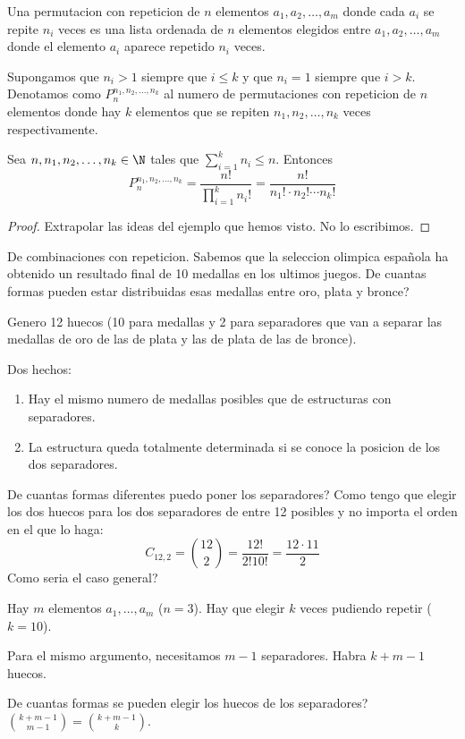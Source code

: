 \begin{definition}
	Una permutacion con repeticion de \(n \) elementos \(a_1,a_2, \ldots, a_m \) donde cada \(a_i \) se repite \(n_i \) veces es una lista ordenada de \(n \) elementos elegidos entre \(a_1,a_2,\ldots,a_m \) donde el elemento \(a_i \) aparece repetido \(n_i \) veces.

	Supongamos que \(n_i > 1 \) siempre que \(i \leq k \) y que \(n_i = 1 \) siempre que \(i > k \). Denotamos como \(P^{n_1,n_2,\ldots,n_k}_n \) al numero de permutaciones con repeticion de \(n \) elementos donde hay \(k \) elementos que se repiten \(n_1,n_2, \ldots, n_k \) veces respectivamente.
\end{definition}
\begin{theorem}
	Sea \(n,n_1,n_2,\ldots,n_k \in \N \) tales que \(\sum_{i=1}^{k} n_i \leq n \). Entonces
	\[
		P^{n_1,n_2,\ldots,n_k}_{n} = \frac{n! }{\prod_{i =1}^{k} n_i !} = \frac{n! }{n_1! \cdot n_2! \cdots n_k!}
	\]
\end{theorem}
\begin{proof}
	Extrapolar las ideas del ejemplo que hemos visto. No lo escribimos.
\end{proof}

\begin{example}
	De combinaciones con repeticion. Sabemos que la seleccion olimpica española ha obtenido un resultado final de 10 medallas en los ultimos juegos. De cuantas formas pueden estar distribuidas esas medallas entre oro, plata y bronce?

	Genero 12 huecos (10 para medallas y 2 para separadores que van a separar las medallas de oro de las de plata y las de plata de las de bronce).

	Dos hechos:
	\begin{enumerate}
		\item Hay el mismo numero de medallas posibles que de estructuras con separadores.
		\item La estructura queda totalmente determinada si se conoce la posicion de los dos separadores.
	\end{enumerate}

	De cuantas formas diferentes puedo poner los separadores? Como tengo que elegir los dos huecos para los dos separadores de entre 12 posibles y no importa el orden en el que lo haga:
	\[
		C_{12,2} = \binom{12 }{2 } = \frac{12! }{2!10! } = \frac{12 \cdot 11 }{2}
	\]
	Como seria el caso general?

	Hay \(m \) elementos \(a_1, \ldots, a_m \) (\(n = 3 \)). Hay que elegir \(k \) veces pudiendo repetir (\(k = 10\)).

	Para el mismo argumento, necesitamos \(m - 1 \) separadores. Habra \(k + m - 1 \) huecos.

	De cuantas formas se pueden elegir los huecos de los separadores? \(\binom{k + m - 1}{m - 1 } = \binom{k + m - 1 }{k}\).
\end{example}

